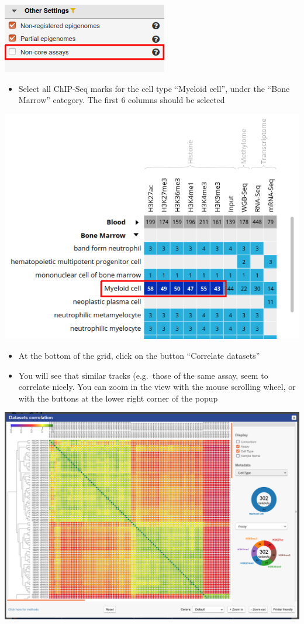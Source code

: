 \documentclass[
]{book}
\providecommand{\tightlist}{%
  \setlength{\itemsep}{0pt}\setlength{\parskip}{0pt}}
\begin{document}
\includegraphics{./img/portal_deselect_non_core_assays.png}

\begin{itemize}
\tightlist
\item
  Select all ChIP-Seq marks for the cell type ``Myeloid cell'', under the ``Bone Marrow'' category. The first 6 columns should be selected
\end{itemize}

\includegraphics{./img/portal_blueprint_chipseq.png}

\begin{itemize}
\item
  At the bottom of the grid, click on the button ``Correlate datasets''
\item
  You will see that similar tracks (e.g.~those of the same assay, seem to correlate nicely. You can zoom in the view with the mouse scrolling wheel, or with the buttons at the lower right corner of the popup
\end{itemize}

\includegraphics{./img/portal_clusteringPerMark.png}
\end{document}

